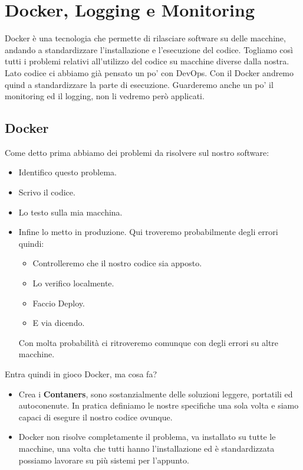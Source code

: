 \documentclass[a4paper,12pt]{article}
\begin{document}
\section{Docker, Logging e Monitoring}
Docker è una tecnologia che permette di rilasciare software su delle macchine, andando a standardizzare l'installazione e l'esecuzione del codice. Togliamo così tutti i problemi relativi all'utilizzo del codice
su macchine diverse dalla nostra. Lato codice ci abbiamo già pensato un po' con DevOps. Con il Docker andremo quind a standardizzare la parte di esecuzione.
Guarderemo anche un po' il monitoring ed il logging, non li vedremo però applicati. 

\subsection{Docker}
Come detto prima abbiamo dei problemi da risolvere sul nostro software:
\begin{itemize}
    \item Identifico questo problema.
    \item Scrivo il codice. 
    \item Lo testo sulla mia macchina.
    \item Infine lo metto in produzione.
    Qui troveremo probabilmente degli errori quindi:
    \begin{itemize}
        \item Controlleremo che il nostro codice sia apposto.
        \item Lo verifico localmente.
        \item Faccio Deploy.
        \item E via dicendo.
    \end{itemize}
    Con molta probabilità ci ritroveremo comunque con degli errori su altre macchine.
\end{itemize}
Entra quindi in gioco Docker, ma cosa fa?
\begin{itemize}
    \item Crea i \textbf{Contaners}, sono sostanzialmente delle soluzioni leggere, portatili ed autoconenute. In pratica definiamo le nostre specifiche una sola volta e siamo capaci di esegure il nostro codice ovunque.
    \item Docker non risolve completamente il problema, va installato su tutte le macchine, una volta che tutti hanno l'installazione ed è standardizzata possiamo lavorare su più sistemi per l'appunto.  
\end{itemize}
\end{document}
